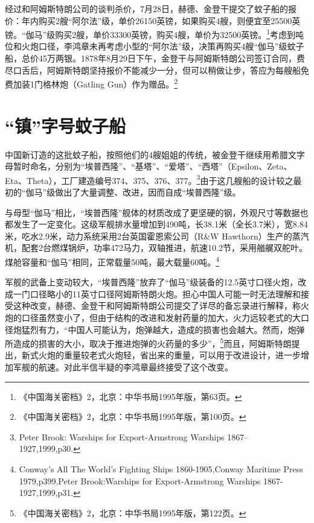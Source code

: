\documentclass[12pt,UTF8]{ctexbook}
\begin{document}
经过和阿姆斯特朗公司的谈判杀价，7月28日，赫德、金登干提交了蚊子船的报价：年内购买2艘“阿尔法”级，单价26150英镑，如果购买4艘，则便宜至25500英镑。“伽马”级购买2艘，单价33300英镑，购买4艘，单价为32500英镑。\footnote{《中国海关密档》2，北京：中华书局1995年版，第63页。}考虑到吨位和火炮口径，李鸿章未再考虑小型的“阿尔法”级，决策再购买4艘“伽马”级蚊子船，总价45万两银。1878年8月29日下午，金登干与阿姆斯特朗公司签订合同，费尽口舌后，阿姆斯特朗坚持报价不能减少一分，但可以稍做让步，答应为每艘船免费加装1门格林炮（Gatling Gun）作为赠品。\footnote{《中国海关密档》2，北京：中华书局1995年版，第100页。}

\section{“镇”字号蚊子船}

中国新订造的这批蚊子船，按照他们的4艘姐姐的传统，被金登干继续用希腊文字母暂时命名，分别为“埃普西隆”、“基塔”、“爱塔”、“西塔”（Epsilon、Zeta、Eta、Theta），工厂建造编号374、375、376、377。\footnote{Peter Brook: Warships for Export-Armstrong Warships 1867--1927,1999,p30.}由于这几艘船的设计较之最初的“伽马”级做出了大量调整、改进，因而自成“埃普西隆”级。

与母型“伽马”相比，“埃普西隆”舰体的材质改成了更坚硬的钢，外观尺寸等数据也都发生了一定变化。这级军舰排水量增加到490吨，长38.1米（全长3.7米），宽8.84米，吃水2.9米，动力系统采用2台英国霍恩索公司（R\&W Hawthorn）生产的蒸汽机，配套2台燃煤锅炉，功率472马力，双轴推进，航速10.2节，采用艏艉双舵叶。煤舱容量和“伽马”相同，正常载量50吨，最大载量60吨。\footnote{Conway's All The World's Fighting Ships 1860-1905,Conway Maritime Press 1979,p399.Peter Brook:Warships for Export-Armstrong Warships 1867-1927,1999,p31.}

军舰的武备上变动较大，“埃普西隆”放弃了“伽马”级装备的12.5英寸口径火炮，改成一门口径略小的11英寸口径阿姆斯特朗火炮。担心中国人可能一时无法理解和接受这种改变，赫德、金登干和阿姆斯特朗公司提交了详尽的备忘录进行解释，称火炮的口径虽然变小了，但由于结构的改进和发射药量的加大，火力远较老式的大口径炮猛烈有力，“中国人可能认为，炮弹越大，造成的损害也会越大。然而，炮弹所造成的损害的大小，取决于推进炮弹的火药量的多少”，\footnote{《中国海关密档》2，北京：中华书局1995年版，第122页。}而且，阿姆斯特朗提出，新式火炮的重量较老式火炮轻，省出来的重量，可以用于改进设计，进一步增加军舰的航速。对此半信半疑的李鸿章最终接受了这个改变。
\end{document}

